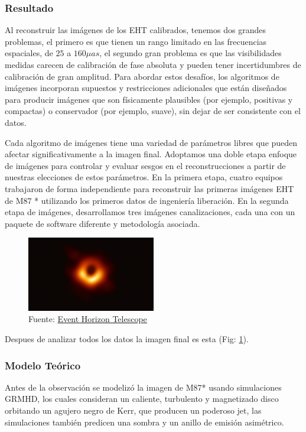 \documentclass{article}
\begin{document}
\subsubsection{Resultado}
Al reconstruir las imágenes de los EHT calibrados, tenemos dos grandes problemas, el primero es que tienen un rango limitado en las frecuencias espaciales, de $25$ a $160\mu as$, el segundo gran problema es que las visibilidades medidas carecen de calibración de fase absoluta y pueden tener incertidumbres de calibración de gran amplitud. Para abordar estos desafíos, los algoritmos de imágenes incorporan supuestos y restricciones adicionales que están diseñados para producir imágenes que son físicamente plausibles (por ejemplo, positivas y compactas) o conservador (por ejemplo, suave), sin dejar de ser consistente con el datos.\cite{event2019firstI}

Cada algoritmo de imágenes tiene una variedad de parámetros libres que pueden afectar significativamente a la imagen final. Adoptamos una doble etapa enfoque de imágenes para controlar y evaluar sesgos en el reconstrucciones a partir de nuestras elecciones de estos parámetros. En la primera etapa, cuatro equipos trabajaron de forma independiente para reconstruir las primeras imágenes EHT de M87 * utilizando los primeros datos de ingeniería liberación. En la segunda etapa de imágenes, desarrollamos tres imágenes canalizaciones, cada una con un paquete de software diferente y metodología asociada.\cite{event2019firstI}

\begin{figure}[H]
    \centering
    \includegraphics[width=0.5\textwidth]{20190410-78m-800x466.png}
    \caption{Fuente: \href{https://eventhorizontelescope.org/press-release-april-10-2019-astronomers-capture-first-image-black-hole}{Event Horizon Telescope}}
    \label{fig:M87}
\end{figure}

Despues de analizar todos los datos la imagen final es esta (Fig: \ref{fig:M87}).

\subsubsection{Modelo Teórico}
Antes de la observación se modelizó la imagen de M87* usando simulaciones GRMHD, los cuales consideran un caliente, turbulento y magnetizado disco orbitando un agujero negro de Kerr, que producen un poderoso jet, las simulaciones también predicen una sombra y un anillo de emisión asimétrico.\cite{event2019firstI}
\end{document}
